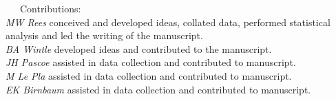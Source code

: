 \documentclass[11pt,a4paper,titlepage,twoside,openright]{style/unimelbthesis}
\begin{document}
\begin{frontmatter}
\begin{preface}
    ~~~Contributions:\\
    \hspace*{0.333em}\hspace*{0.333em}\hspace*{0.333em}\hspace*{0.333em}\hspace*{0.333em}\hspace*{0.333em}\hspace*{0.333em}\hspace*{0.333em}\emph{MW Rees} conceived and developed ideas, collated data, performed statistical analysis and led the writing of the manuscript.\\
    \hspace*{0.333em}\hspace*{0.333em}\hspace*{0.333em}\hspace*{0.333em}\hspace*{0.333em}\hspace*{0.333em}\hspace*{0.333em}\hspace*{0.333em}\emph{BA Wintle} developed ideas and contributed to the manuscript.\\
    \hspace*{0.333em}\hspace*{0.333em}\hspace*{0.333em}\hspace*{0.333em}\hspace*{0.333em}\hspace*{0.333em}\hspace*{0.333em}\hspace*{0.333em}\emph{JH Pascoe} assisted in data collection and contributed to manuscript.\\
    \hspace*{0.333em}\hspace*{0.333em}\hspace*{0.333em}\hspace*{0.333em}\hspace*{0.333em}\hspace*{0.333em}\hspace*{0.333em}\hspace*{0.333em}\emph{M Le Pla} assisted in data collection and contributed to manuscript.\\
    \hspace*{0.333em}\hspace*{0.333em}\hspace*{0.333em}\hspace*{0.333em}\hspace*{0.333em}\hspace*{0.333em}\hspace*{0.333em}\hspace*{0.333em}\emph{EK Birnbaum} assisted in data collection and contributed to manuscript.\\

\end{preface}
\end{frontmatter}
\end{document}

